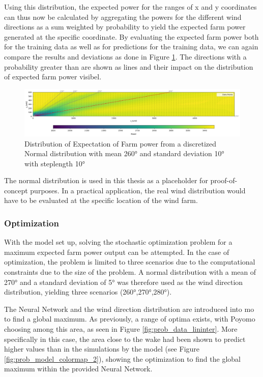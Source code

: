 \documentclass[preprint,12pt]{elsarticle}
\begin{document}
Using this distribution, the expected power for the ranges of x and y coordinates can thus now be calculated by aggregating the powers for the different wind directions as a sum weighted by probability to yield the expected farm power generated at the specific coordinate. By evaluating the expected farm power both for the training data as well as for predictions for the training data, we can again compare the results and deviations as done in Figure \ref{fig:prob_expectation}. The directions with a probability greater than are shown as lines and their impact on the distribution of expected farm power visibel.

\begin{figure}[h] 
	\centering
	\includegraphics[width=1\textwidth]{../figures/optimization/prob_expectation.png} 
	\caption{Distribution of Expectation of Farm power from a discretized Normal distribution with mean 260° and standard deviation 10° with steplength 10°}
	\label{fig:prob_expectation}
\end{figure}


The normal distribution is used in this thesis as a placeholder for proof-of-concept purposes. In a practical application, the real wind distribution would have to be evaluated at the specific location of the wind farm. 

\subsubsection{Optimization}

With the model set up, solving the stochastic optimization problem for a maximum expected farm power output can be attempted. In the case of optimization, the problem is limited to three scenarios due to the computational constraints due to the size of the problem. A normal distribution with a mean of 270° and  a standard deviation of 5° was therefore used as the wind direction distribution, yielding three scenarios (260°,270°,280°).

The Neural Network and the wind direction distribution are introduced into mo to find a global maximum. As previously, a range of optima exists, with Poyomo choosing among this area, as seen in Figure \ref{fig:prob_data_lininter}. More specifically in this case, the area close to the wake had been shown to predict higher values than in the simulations by the model (see Figure \ref{fig:prob_model_colormap_2}), showing the optimization to find the global maximum within the provided Neural Network. 
\end{document}

